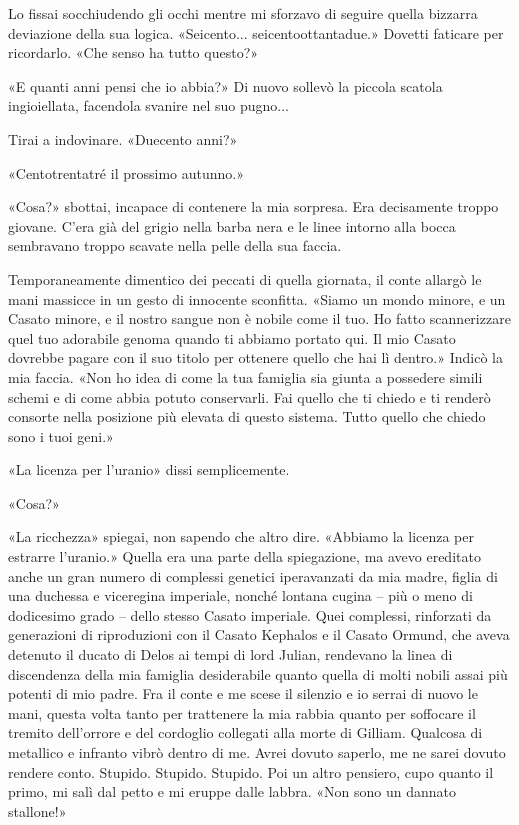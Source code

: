 Lo fissai socchiudendo gli occhi mentre mi sforzavo di seguire quella
bizzarra deviazione della sua logica. «Seicento... seicentoottantadue.»
Dovetti faticare per ricordarlo. «Che senso ha tutto questo?»

«E quanti anni pensi che io abbia?» Di nuovo sollevò la piccola scatola
ingioiellata, facendola svanire nel suo pugno...

Tirai a indovinare. «Duecento anni?»

«Centotrentatré il prossimo autunno.»

«Cosa?» sbottai, incapace di contenere la mia sorpresa. Era decisamente
troppo giovane. C'era già del grigio nella barba nera e le linee intorno
alla bocca sembravano troppo scavate nella pelle della sua faccia.

Temporaneamente dimentico dei peccati di quella giornata, il conte
allargò le mani massicce in un gesto di innocente sconfitta. «Siamo un
mondo minore, e un Casato minore, e il nostro sangue non è nobile come
il tuo. Ho fatto scannerizzare quel tuo adorabile genoma quando ti
abbiamo portato qui. Il mio Casato dovrebbe pagare con il suo titolo per
ottenere quello che hai lì dentro.» Indicò la mia faccia. «Non ho idea
di come la tua famiglia sia giunta a possedere simili schemi e di come
abbia potuto conservarli. Fai quello che ti chiedo e ti renderò consorte
nella posizione più elevata di questo sistema. Tutto quello che chiedo
sono i tuoi geni.»

«La licenza per l'uranio» dissi semplicemente.

«Cosa?»

«La ricchezza» spiegai, non sapendo che altro dire. «Abbiamo la licenza
per estrarre l'uranio.» Quella era una parte della spiegazione, ma avevo
ereditato anche un gran numero di complessi genetici iperavanzati da mia
madre, figlia di una duchessa e viceregina imperiale, nonché lontana
cugina -- più o meno di dodicesimo grado -- dello stesso Casato
imperiale. Quei complessi, rinforzati da generazioni di riproduzioni con
il Casato Kephalos e il Casato Ormund, che aveva detenuto il ducato di
Delos ai tempi di lord Julian, rendevano la linea di discendenza della
mia famiglia desiderabile quanto quella di molti nobili assai più
potenti di mio padre. Fra il conte e me scese il silenzio e io serrai di
nuovo le mani, questa volta tanto per trattenere la mia rabbia quanto
per soffocare il tremito dell'orrore e del cordoglio collegati alla
morte di Gilliam. Qualcosa di metallico e infranto vibrò dentro di me.
Avrei dovuto saperlo, me ne sarei dovuto rendere conto. Stupido.
Stupido. Stupido. Poi un altro pensiero, cupo quanto il primo, mi salì
dal petto e mi eruppe dalle labbra. «Non sono un dannato stallone!»

